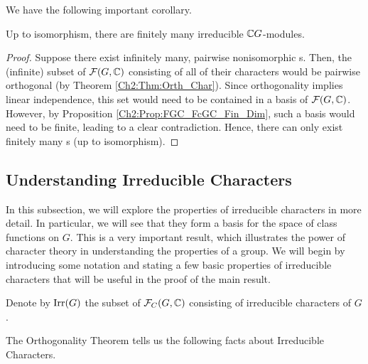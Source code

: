 We have the following important corollary.

\begin{corollary}
    Up to isomorphism, there are finitely many irreducible $\mathbb{C} G$-modules.
\end{corollary}
\begin{proof}
    Suppose there exist infinitely many, pairwise nonisomorphic \CGM s. Then, the (infinite) subset of $\mathcal{F}\!\left( G, \mathbb{C} \right)$ consisting of all of their characters would be pairwise orthogonal (by Theorem \ref{Ch2:Thm:Orth_Char}). Since orthogonality implies linear independence, this set would need to be contained in a basis of $\mathcal{F}\!\left( G, \mathbb{C} \right)$. However, by Proposition \ref{Ch2:Prop:FGC_FcGC_Fin_Dim}, such a basis would need to be finite, leading to a clear contradiction. Hence, there can only exist finitely many \CGM s (up to isomorphism).
\end{proof}

\subsection{Understanding Irreducible Characters}

In this subsection, we will explore the properties of irreducible characters in more detail. In particular, we will see that they form a basis for the space of class functions on $G$. This is a very important result, which illustrates the power of character theory in understanding the properties of a group. We will begin by introducing some notation and stating a few basic properties of irreducible characters that will be useful in the proof of the main result.

\begin{boxnotation}
    Denote by $\operatorname{Irr}\!\left( G \right)$ the subset of $\mathcal{F}_C\!\left( G, \mathbb{C} \right)$ consisting of irreducible characters of $G$.
\end{boxnotation}

The Orthogonality Theorem tells us the following facts about Irreducible Characters.

